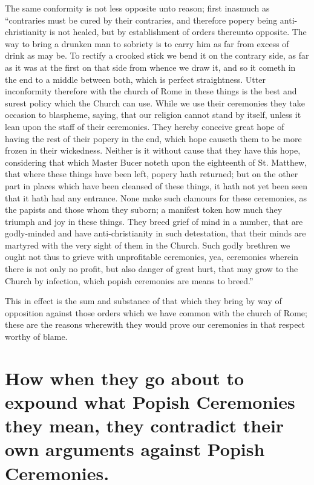 The same conformity is not less opposite unto reason; first inasmuch as “contraries must be cured by their contraries, and therefore popery being anti-christianity is not healed, but by establishment of orders thereunto opposite. The way to bring a drunken man to sobriety is to carry him as far from excess of drink as may be. To rectify a crooked  stick we bend it on the contrary side, as far as it was at the first on that side from whence we draw it, and so it cometh in the end to a middle between both, which is perfect straightness. Utter inconformity therefore with the church of Rome in these things is the best and surest policy which the Church can use. While we use their ceremonies they take occasion to blaspheme, saying, that our religion cannot stand by itself, unless it lean upon the staff of their ceremonies. They hereby conceive great hope of having the rest of their popery in the end, which hope causeth them to be more frozen in their wickedness. Neither is it without cause that they have this hope, considering that which Master Bucer noteth upon the eighteenth of St. Matthew, that where these things have been left, popery hath returned; but on the other part in places which have been cleansed of these things, it hath not yet been seen that it hath had any entrance. None make such clamours for these ceremonies, as the papists and those whom they suborn; a manifest token how much they triumph and joy in these things. They breed grief of mind in a number, that are godly-minded and have anti-christianity in such detestation, that their minds are martyred with the very sight of them in the Church. Such godly brethren we ought not thus to grieve with unprofitable ceremonies, yea, ceremonies wherein there is not only no profit, but also danger of great hurt, that may grow to the Church by infection, which popish ceremonies are means to breed.”

This in effect is the sum and substance of that which they bring by way of opposition against those orders which we have common with the church of Rome; these are the reasons wherewith they would prove our ceremonies in that respect worthy of blame.

\section*{How when they go about to expound what Popish Ceremonies they mean, they contradict their own arguments against Popish Ceremonies.}

